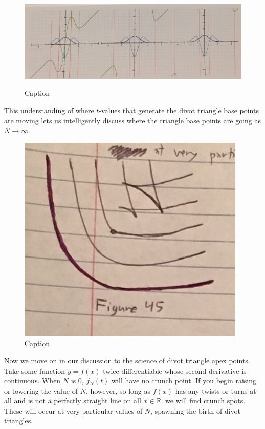 \renewcommand\w{0.9\textwidth}
\renewcommand\fw{0.9\linewidth}
\renewcommand\fh{.25\textheight}

\begin{figure}[H]
  \centering
  \begin{minipage}[b]{\w}
    \label{divot:5}
    \includegraphics[width=\fw, height=\fh, keepaspectratio]{img/12-divot/05.png}
    \caption{Caption}
  \end{minipage}
\end{figure}

This understanding of where $t$-values that generate the divot triangle base points are moving lets us intelligently discuss where the triangle base points are going as $N \xrightarrow{} \infty$.

\renewcommand\w{0.25\textwidth}
\renewcommand\fw{0.9\linewidth}

\begin{figure}
  \includegraphics[width=\fw]{img/12-divot/06.png}
  \caption{Caption}
  \label{divot:6}
\end{figure}

Now we move on in our discussion to the science of divot triangle apex points. Take some function $y = f(x)$ twice differentiable whose second derivative is continuous.  When $N$ is 0, $f_N(t)$ will have no crunch point. If you begin raising or lowering the value of $N$, however, so long as $f(x)$ has any twists or turns at all and is not a perfectly straight line on all $x \in \mathbb{R}$. we will find crunch spots. These will occur at very particular values of $N$, spawning the birth of divot triangles.

